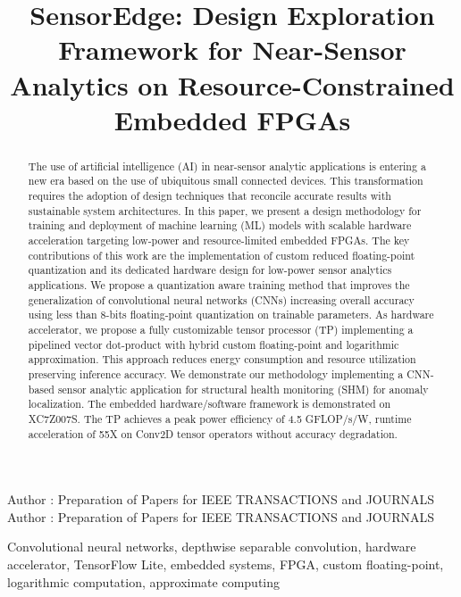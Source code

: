 \title {SensorEdge: Design Exploration Framework for Near-Sensor Analytics on Resource-Constrained Embedded FPGAs}



\markboth
{Author \headeretal: Preparation of Papers for IEEE TRANSACTIONS and JOURNALS}
{Author \headeretal: Preparation of Papers for IEEE TRANSACTIONS and JOURNALS}


\begin{abstract}
The use of artificial intelligence (AI) in near-sensor analytic applications is entering a new era based on the use of ubiquitous small connected devices. This transformation requires the adoption of design techniques that reconcile accurate results with sustainable system architectures. In this paper, we present a design methodology for training and deployment of machine learning (ML) models with scalable hardware acceleration targeting low-power and resource-limited embedded FPGAs. The key contributions of this work are the implementation of custom reduced floating-point quantization and its dedicated hardware design for low-power sensor analytics applications. We propose a quantization aware training method that improves the generalization of convolutional neural networks (CNNs) increasing overall accuracy using less than 8-bits floating-point quantization on trainable parameters. As hardware accelerator, we propose a fully customizable tensor processor (TP) implementing a pipelined vector dot-product with hybrid custom floating-point and logarithmic approximation. This approach reduces energy consumption and resource utilization preserving inference accuracy. We demonstrate our methodology implementing a CNN-based sensor analytic application for structural health monitoring (SHM) for anomaly localization. The embedded hardware/software framework is demonstrated on XC7Z007S. The TP achieves a peak power efficiency of 4.5 GFLOP/s/W, runtime acceleration of 55X on Conv2D tensor operators without accuracy degradation.
\end{abstract}

\begin{keywords}
Convolutional neural networks, depthwise separable convolution, hardware accelerator, TensorFlow Lite, embedded systems, FPGA, custom floating-point, logarithmic computation, approximate computing
\end{keywords}

\titlepgskip=-15pt

\maketitle